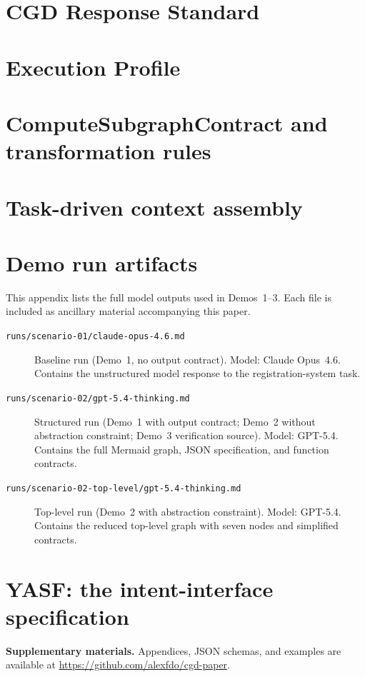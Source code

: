 \documentclass[12pt,a4paper]{article}
\begin{document}
\appendix

\section{CGD Response Standard}
\label{app:response-standard}


\section{Execution Profile}
\label{app:execution-profile}


\section{ComputeSubgraphContract and transformation rules}
\label{app:subgraph-contract}


\section{Task-driven context assembly}
\label{app:context-assembly}


\section{Demo run artifacts}
\label{app:demo-artifacts}

This appendix lists the full model outputs used in Demos~1--3.
Each file is included as ancillary material accompanying this paper.

\begin{description}
\item[\texttt{runs/scenario-01/claude-opus-4.6.md}]
  Baseline run (Demo~1, no output contract). Model: Claude Opus~4.6.
  Contains the unstructured model response to the registration-system task.

\item[\texttt{runs/scenario-02/gpt-5.4-thinking.md}]
  Structured run (Demo~1 with output contract; Demo~2 without abstraction constraint; Demo~3 verification source). Model: GPT-5.4.
  Contains the full Mermaid graph, JSON specification, and function contracts.

\item[\texttt{runs/scenario-02-top-level/gpt-5.4-thinking.md}]
  Top-level run (Demo~2 with abstraction constraint). Model: GPT-5.4.
  Contains the reduced top-level graph with seven nodes and simplified contracts.
\end{description}

\section{YASF: the intent-interface specification}
\label{app:yasf}





\bigskip
\noindent\textbf{Supplementary materials.}
Appendices, JSON schemas, and examples are available at
\url{https://github.com/alexfdo/cgd-paper}.
\end{document}
